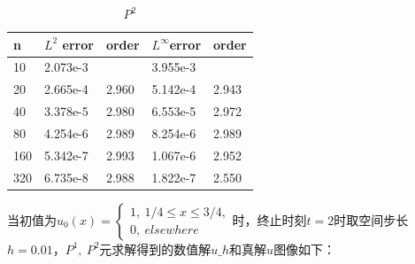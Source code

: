 \documentclass[12pt, a4paper]{ctexart}
\begin{document}
\begin{table}[htbp]
	\centering
	\caption{$P^2$}
	\begin{tabular}{| p{40pt}<{\centering} | p{80pt}<{\centering} | p{60pt}<{\centering} || p{80pt}<{\centering} | p{60pt}<{\centering}|}
		\hline
		n & $L^2$ error & order & $L^\infty$error & order\\
		\hline
		10 & 2.073e-3 & & 3.955e-3 & \\
		\hline
		20 & 2.665e-4 & 2.960 & 5.142e-4 & 2.943\\
		\hline
		40 & 3.378e-5 & 2.980 & 6.553e-5 & 2.972\\
		\hline
		80 & 4.254e-6 & 2.989 & 8.254e-6 & 2.989\\
		\hline
		160 & 5.342e-7 & 2.993 & 1.067e-6 & 2.952\\
		\hline
		320 & 6.735e-8 & 2.988 & 1.822e-7 & 2.550\\
		\hline
	\end{tabular}
\end{table}

	当初值为$u_0(x) = \begin{cases} 1, \  1/4 \leq x \leq 3/4,\\ 0, \ elsewhere\end{cases}$时，终止时刻$t=2$时取空间步长$h = 0.01$，$P^1, \  P^2$元求解得到的数值解$u\_h$和真解$u$图像如下：
\end{document}
